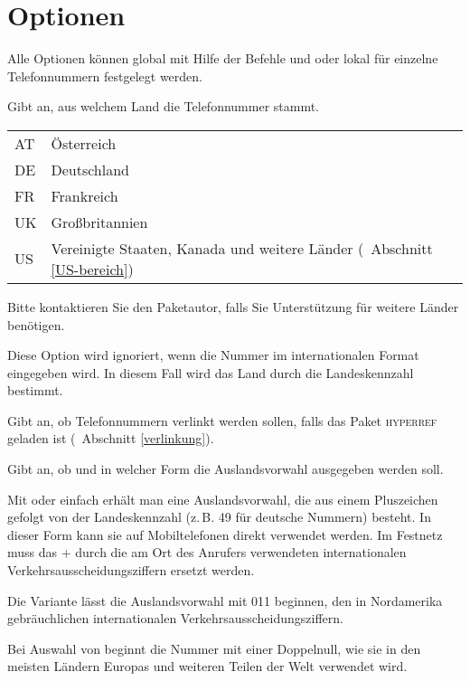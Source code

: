 \documentclass[numbers=noenddot]{scrreprt}
\newcommand*{\Paket}[1]{\textsc{#1}}
\newcommand*{\UeberschriftOptionen}[1]{\section{Optionen}\label{optionen-#1}}
\newcommand*{\vglAbschnitt}[1]{(\cf\ Abschnitt \ref{#1})}
\begin{document}
\UeberschriftOptionen{allgemein}
Alle Optionen können global mit Hilfe der Befehle  und  oder lokal für einzelne Telefonnummern festgelegt werden.
\begin{Befehlsliste}
Gibt an, aus welchem Land die Telefonnummer stammt.
\begin{center}
\begin{tabular}{>{\ttfamily}ll}
AT & Österreich \\
DE & Deutschland \\
FR & Frankreich \\
UK & Großbritannien \\
US & Vereinigte Staaten, Kanada und weitere Länder
\vglAbschnitt{US-bereich}
\end{tabular}
\end{center}
Bitte kontaktieren Sie den Paketautor, falls Sie Unterstützung für weitere Länder benötigen.

Diese Option wird ignoriert, wenn die Nummer im internationalen Format eingegeben wird. In diesem Fall wird das Land durch die Landeskennzahl bestimmt.

Gibt an, ob Telefonnummern verlinkt werden sollen, falls das Paket \Paket{hyperref} geladen ist
\vglAbschnitt{verlinkung}.

Gibt an, ob und in welcher Form die Auslandsvorwahl ausgegeben werden soll.

Mit  oder einfach  erhält man eine Auslandsvorwahl, die aus einem Pluszeichen gefolgt von der Landeskennzahl (z.\,B. 49 für deutsche Nummern) besteht. In dieser Form kann sie auf Mobiltelefonen direkt verwendet werden. Im Festnetz muss das + durch die am Ort des Anrufers verwendeten internationalen Verkehrsausscheidungsziffern ersetzt werden.
\begin{sidebyside}
\end{sidebyside}
Die Variante  lässt die Auslandsvorwahl mit 011 beginnen, den in Nordamerika gebräuchlichen internationalen Verkehrsausscheidungsziffern.
\begin{sidebyside}
\end{sidebyside}
Bei Auswahl von  beginnt die Nummer mit einer Doppelnull, wie sie in den meisten Ländern Europas und weiteren Teilen der Welt verwendet wird.
\begin{sidebyside}
\end{sidebyside}


\end{Befehlsliste}
\end{document}
